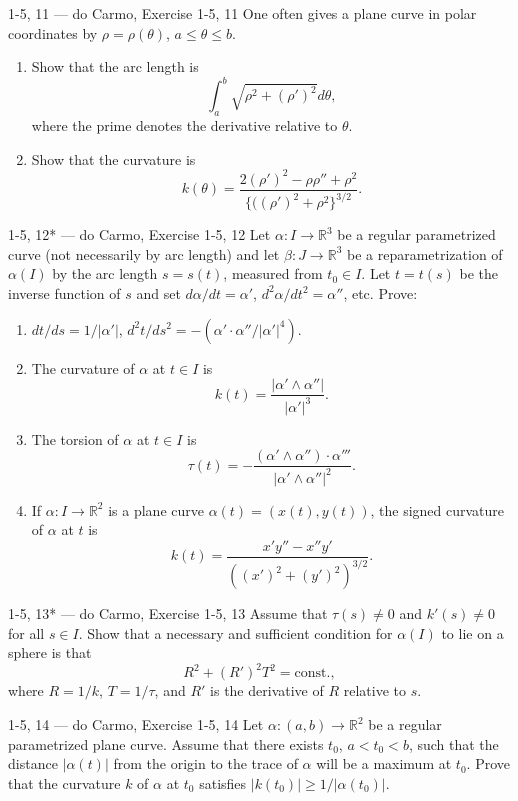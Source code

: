 \begin{exercise}{1-5, 11 — do Carmo, Exercise 1-5, 11}
One often gives a plane curve in polar coordinates by $\rho = \rho(\theta)$, $a \leq \theta \leq b$.
\begin{enumerate}
\item[a.] Show that the arc length is
\[
\int_a^b \sqrt{\rho^2 + (\rho')^2} d\theta,
\]
where the prime denotes the derivative relative to $\theta$.
\item[b.] Show that the curvature is
\[
k(\theta) = \frac{2(\rho')^2 - \rho\rho'' + \rho^2}{\{((\rho')^2 + \rho^2\}^{3/2}}.
\]
\end{enumerate}
\end{exercise}

\begin{exercise}{1-5, 12* — do Carmo, Exercise 1-5, 12}
Let $\alpha: I \to \mathbb{R}^3$ be a regular parametrized curve (not necessarily by arc length) and let $\beta: J \to \mathbb{R}^3$ be a reparametrization of $\alpha(I)$ by the arc length $s = s(t)$, measured from $t_0 \in I$. Let $t = t(s)$ be the inverse function of $s$ and set $d\alpha/dt = \alpha'$, $d^2\alpha/dt^2 = \alpha''$, etc. Prove:
\begin{enumerate}
\item[a.] $dt/ds = 1/|\alpha'|$, $d^2t/ds^2 = -(\alpha' \cdot \alpha'' / |\alpha'|^4)$.
\item[b.] The curvature of $\alpha$ at $t \in I$ is
\[
k(t) = \frac{|\alpha' \wedge \alpha''|}{|\alpha'|^3}.
\]
\item[c.] The torsion of $\alpha$ at $t \in I$ is
\[
\tau(t) = - \frac{(\alpha' \wedge \alpha'') \cdot \alpha'''}{|\alpha' \wedge \alpha''|^2}.
\]
\item[d.] If $\alpha: I \to \mathbb{R}^2$ is a plane curve $\alpha(t) = (x(t), y(t))$, the signed curvature of $\alpha$ at $t$ is
\[
k(t) = \frac{x'y'' - x''y'}{((x')^2 + (y')^2)^{3/2}}.
\]
\end{enumerate}
\end{exercise}

\begin{exercise}{1-5, 13* — do Carmo, Exercise 1-5, 13}
Assume that $\tau(s) \neq 0$ and $k'(s) \neq 0$ for all $s \in I$. Show that a necessary and sufficient condition for $\alpha(I)$ to lie on a sphere is that
\[
R^2 + (R')^2 T^2 = \mathrm{const.},
\]
where $R = 1/k$, $T = 1/\tau$, and $R'$ is the derivative of $R$ relative to $s$.
\end{exercise}

\begin{exercise}{1-5, 14 — do Carmo, Exercise 1-5, 14}
Let $\alpha: (a, b) \to \mathbb{R}^2$ be a regular parametrized plane curve. Assume that there exists $t_0$, $a < t_0 < b$, such that the distance $|\alpha(t)|$ from the origin to the trace of $\alpha$ will be a maximum at $t_0$. Prove that the curvature $k$ of $\alpha$ at $t_0$ satisfies $|k(t_0)| \geq 1/|\alpha(t_0)|$.
\end{exercise}

